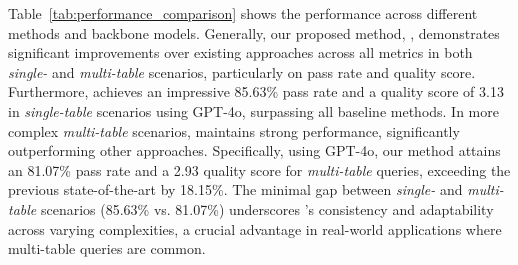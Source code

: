 Table~\ref{tab:performance_comparison} shows the performance across different methods and backbone models. Generally, our proposed method, \system, demonstrates significant improvements over existing approaches across all metrics in both \textit{single-} and \textit{multi-table} scenarios, particularly on pass rate and quality score.
Furthermore, \system achieves an impressive 85.63\% pass rate and a quality score of 3.13 in \textit{single-table} scenarios using GPT-4o, surpassing all baseline methods. In more complex \textit{multi-table} scenarios, \system maintains strong performance, significantly outperforming other approaches. Specifically, using GPT-4o, our method attains an 81.07\% pass rate and a 2.93 quality score for \textit{multi-table} queries, exceeding the previous state-of-the-art by 18.15\%. 
The minimal gap between \textit{single-} and \textit{multi-table} scenarios (85.63\% vs. 81.07\%) underscores \system's consistency and adaptability across varying complexities, a crucial advantage in real-world applications where multi-table queries are common.

